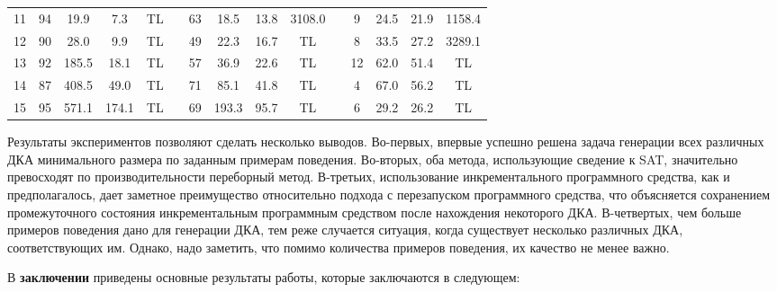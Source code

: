 \begin{table}
{\begin{tabular}{ccccccccccccccc}
      11 & 94  & 19.9  & 7.3   & TL             & & 63  & 18.5  & 13.8 & 3108.0          & & 9   & 24.5 & 21.9 & 1158.4 \\
      12 & 90  & 28.0  & 9.9   & TL             & & 49  & 22.3  & 16.7 & TL              & & 8   & 33.5 & 27.2 & 3289.1 \\
      13 & 92  & 185.5 & 18.1  & TL             & & 57  & 36.9  & 22.6 & TL              & & 12  & 62.0 & 51.4 & TL \\
      14 & 87  & 408.5 & 49.0  & TL             & & 71  & 85.1  & 41.8 & TL              & & 4   & 67.0 & 56.2 & TL \\
      15 & 95  & 571.1 & 174.1 & TL             & & 69  & 193.3 & 95.7 & TL              & & 6   & 29.2 & 26.2 & TL \\
      \hline
    \end{tabular}
  }
  \label{syn:tab:find-all}
\end{table}

Результаты экспериментов позволяют сделать несколько выводов.
Во-первых, впервые успешно решена задача генерации всех различных ДКА минимального размера по заданным примерам поведения.
Во-вторых, оба метода, использующие сведение к SAT, значительно превосходят по производительности переборный метод.
В-третьих, использование инкрементального программного средства, как и предполагалось, дает заметное преимущество относительно подхода с перезапуском программного средства, что объясняется сохранением промежуточного состояния инкрементальным программным средством после нахождения некоторого ДКА.
В-четвертых, чем больше примеров поведения дано для генерации ДКА, тем реже случается ситуация, когда существует несколько различных ДКА, соответствующих им.
Однако, надо заметить, что помимо количества примеров поведения, их качество не менее важно.



В \textbf{заключении} приведены основные результаты работы, которые заключаются в следующем:


